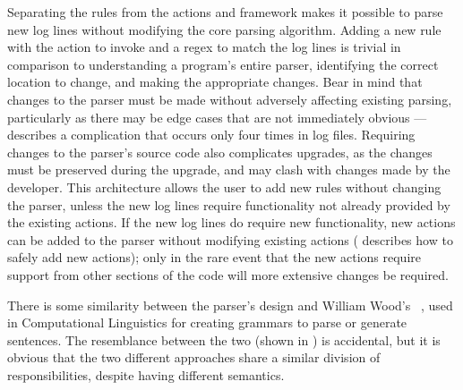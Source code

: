 Separating the rules from the actions and framework makes it possible to
parse new log lines without modifying the core parsing algorithm.  Adding a
new rule with the action to invoke and a regex to match the log lines is
trivial in comparison to understanding a program's entire parser,
identifying the correct location to change, and making the appropriate
changes.  Bear in mind that changes to the parser must be made without
adversely affecting existing parsing, particularly as there may be edge
cases that are not immediately obvious ---
 describes a complication
that occurs only four times in \numberOFlogFILES{} log files.  Requiring
changes to the parser's source code also complicates upgrades, as the
changes must be preserved during the upgrade, and may clash with changes
made by the developer.  This architecture allows the user to add new rules
without changing the parser, unless the new log lines require functionality
not already provided by the existing actions.  If the new log lines do
require new functionality, new actions can be added to the parser without
modifying existing actions ( describes how to safely add new actions); only in the rare
event that the new actions require support from other sections of the code
will more extensive changes be required.

There is some similarity between the parser's design and William Wood's
~\cite{atns,nlpip}, used in Computational Linguistics for creating
grammars to parse or generate sentences.  The resemblance between the two
(shown in ) is
accidental, but it is obvious that the two different approaches share a
similar division of responsibilities, despite having different semantics.


